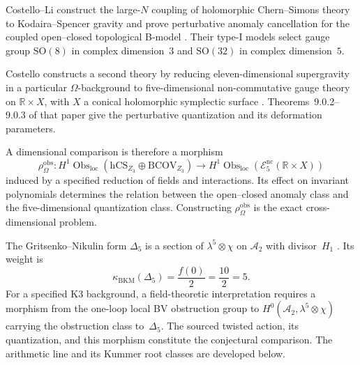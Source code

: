\begin{remark}
\label{rem:bvbrst-6d-hcs-quartic}
Costello--Li construct the large-$N$ coupling of holomorphic
Chern--Simons theory to Kodaira--Spencer gravity and prove
perturbative anomaly cancellation for the coupled open--closed
topological B-model \cite{CL20}.  Their type-I models select gauge
group $\mathrm{SO}(8)$ in complex dimension~$3$ and
$\mathrm{SO}(32)$ in complex dimension~$5$.

Costello constructs a second theory by reducing eleven-dimensional
supergravity in a particular $\Omega$-background to
five-dimensional non-commutative gauge theory on
$\mathbb R\times X$, with $X$ a conical holomorphic symplectic
surface \cite{Costello2111}.  Theorems~9.0.2--9.0.3 of that paper give
the perturbative quantization and its deformation parameters.

A dimensional comparison is therefore a morphism
\[
 \rho_{\Omega}^{\mathrm{obs}}:
 H^1\operatorname{Obs}_{\mathrm{loc}}
   (\mathrm{hCS}_{Z_3}\oplus\mathrm{BCOV}_{Z_3})
 \longrightarrow
 H^1\operatorname{Obs}_{\mathrm{loc}}
   (\mathcal E^{\mathrm{nc}}_5(\mathbb R\times X))
\]
induced by a specified reduction of fields and interactions.  Its
effect on invariant polynomials determines the relation between the
open--closed anomaly class and the five-dimensional quantization
class.  Constructing $\rho_{\Omega}^{\mathrm{obs}}$ is the exact
cross-dimensional problem.
\end{remark}

\begin{remark}
\label{rem:bvbrst-paramodular-anomaly}
The Gritsenko--Nikulin form $\Delta _5$ is a section of
$\lambda^5\otimes\chi$ on $\mathcal A_2$ with divisor~$H_1$
\cite{GN96Igusa}.  Its weight is
\[
 \kappa_{\mathrm{BKM}}(\Delta _5)=\frac{f(0)}2=\frac{10}{2}=5.
\]
For a specified K3 background, a field-theoretic interpretation
requires a morphism from the one-loop local BV obstruction group to
$H^0(\mathcal A_2,\lambda^5\otimes\chi)$ carrying the obstruction
class to~$\Delta _5$.  The sourced twisted action, its quantization,
and this morphism constitute the conjectural comparison.  The
arithmetic line and its Kummer root classes are developed below.
\end{remark}

